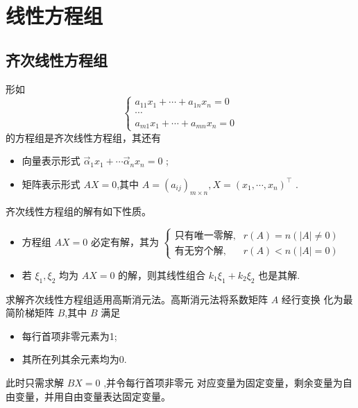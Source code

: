 \chapter{线性方程组}

\section{齐次线性方程组}

形如
\begin{equation*}
    \left\{
    \begin{array}{c}
        a_{11}x_1 + \cdots +a_{1n}x_n = 0\\ 
        \cdots\\ 
        a_{m1}x_1 + \cdots +a_{mn}x_n = 0
    \end{array}
    \right.
\end{equation*}
的方程组是齐次线性方程组，其还有
\begin{itemize}
    \item 向量表示形式
    $ \vec \alpha_1x_1+\cdots \vec\alpha_n x_n = 0 $ ;
    \item 矩阵表示形式
    $ AX = 0 $,其中 $ A = (a_{ij})_{m\times n}, X = (x_1,\cdots, x_n)^\top $ .
\end{itemize}


齐次线性方程组的解有如下性质。

\begin{itemize}
    \item 方程组 $ AX = 0 $ 必定有解，其为 $ \begin{cases}
        \textrm{只有唯一零解},&r(A) = n(|A|\neq 0)\\ 
        \textrm{有无穷个解},&r(A)<n(|A| = 0)
    \end{cases} $ 
    \item 若 $ \xi_1,\xi_2 $ 均为 $ AX = 0 $ 的解，则其线性组合
    $ k_1\xi_1+k_2\xi_2 $ 也是其解.
\end{itemize}


求解齐次线性方程组适用高斯消元法。高斯消元法将系数矩阵 $ A $ 经行变换
化为最简阶梯矩阵 $ B $,其中 $ B $ 满足
\begin{itemize}
    \item 每行首项非零元素为1;
    \item 其所在列其余元素均为0.
\end{itemize}

此时只需求解 $ BX = 0 $ ,并令每行首项非零元
对应变量为固定变量，剩余变量为自由变量，并用自由变量表达固定变量。

